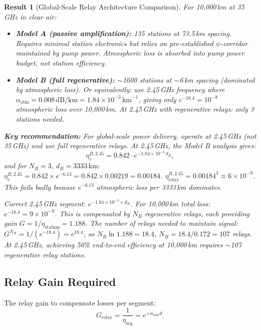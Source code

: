 \documentclass[aps,prd,twocolumn,superscriptaddress]{revtex4-2}
\newtheorem{result}{Result}
\begin{document}
\begin{result}[Global-Scale Relay Architecture Comparison]
\label{result:relay}
For 10,000\,km at 35\,GHz in clear air:
\begin{itemize}
\item \textbf{Model A (passive amplification):}
135 stations at 73.5\,km spacing.
Requires minimal station electronics but relies on pre-established
$\psi$-corridor maintained by pump power.  Atmospheric loss is absorbed
into pump power budget, not station efficiency.
\item \textbf{Model B (full regenerative):}
$\sim$1600 stations at $\sim$6\,km spacing (dominated by atmospheric loss).
Or equivalently: use 2.45\,GHz frequency where
$\alpha_\mathrm{atm} = 0.008\,\mathrm{dB/km} = 1.84\times10^{-3}\,\mathrm{km}^{-1}$,
giving only $e^{-18.4} = 10^{-8}$ atmospheric loss over 10,000\,km.
At 2.45\,GHz with regenerative relays: only 3 stations needed.
\end{itemize}

\textbf{Key recommendation:} For global-scale power delivery, operate at
2.45\,GHz (not 35\,GHz) and use full regenerative relays.  At 2.45\,GHz,
the Model B analysis gives:
\begin{equation}
\eta_r^{B,2.45} = 0.842\cdot e^{-1.84\times10^{-3}\,d_B},
\end{equation}
and for $N_B = 3$, $d_B = 3333\,\mathrm{km}$:
$\eta_r^{B,2.45} = 0.842\times e^{-6.13} = 0.842\times0.00219 = 0.00184$.
$\eta_\mathrm{relay}^{B,2.45} = 0.00184^3 \approx 6\times10^{-9}$.
This fails badly because $e^{-6.13}$ atmospheric loss per 3333\,km
dominates.

Correct 2.45\,GHz segment: $e^{-1.84\times10^{-3}\times d_B}$.
For 10,000\,km total loss: $e^{-18.4} = 9\times10^{-9}$.  This
is compensated by $N_B$ regenerative relays, each providing gain
$G = 1/\eta_\mathrm{station} = 1.188$.  The number of relays needed
to maintain signal:
$G^{N_B} = 1/(e^{-18.4}) = e^{18.4}$, so
$N_B\ln 1.188 = 18.4$, $N_B = 18.4/0.172 = 107$ relays.
At 2.45\,GHz, achieving 50\% end-to-end efficiency at 10,000\,km
requires $\sim$107 regenerative relay stations.
\end{result}

\subsection{Relay Gain Required}

The relay gain to compensate losses per segment:
\begin{equation}
G_\mathrm{relay} = \frac{1}{\eta_\mathrm{seg}}
= e^{+\alpha_\mathrm{atm}d}.
\end{equation}
\end{document}
